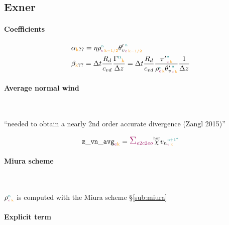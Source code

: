 \clearpage
\subsection{Exner}
\label{sub:exner}

\paragraph{Coefficients}

\begin{align}
  & \alpha_{\k??} = \WtimeVWind \density{\n}{\c}{\k-1/2} \vpotempprime{\n}{\c}{\k-1/2} \\
  & \beta_{\k??} = \Dt \frac{\Rd}{\cvd} \frac{\Gamma^\n_\k}{\Dz{}} = \Dt \frac{\Rd}{\cvd} \frac{\exnerprime{\n}{\c}{\k}}{\density{\n}{\c}{\k}\vpotempprime{\n}{\c}{\k}} \frac{1}{\Dz{}}
\end{align}

\paragraph{Average normal wind}\

``needed to obtain a nearly 2nd order accurate divergence (Zangl 2015)''

\begin{equation}
  \zvnavg_{\e\k} = \sum_{\offProv{e2c2eo}} \Whor \vn{\n+1^*}{\e}{\k}
\end{equation}

\paragraph{Miura scheme}\

$\density{\n}{\e}{\k}$ is computed with the Miura scheme \S\ref{sub:miura}

\paragraph{Explicit term}

